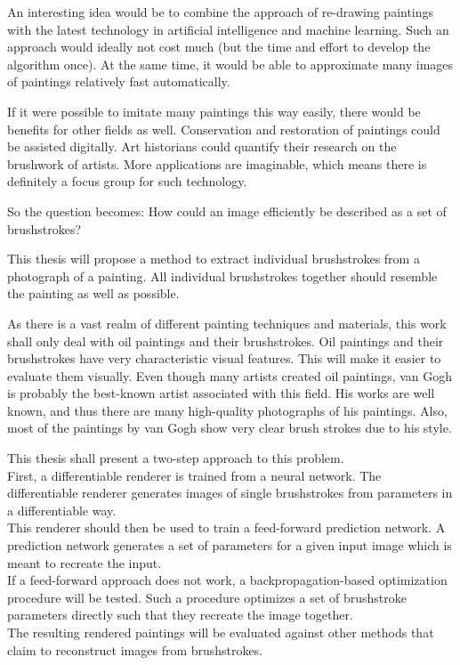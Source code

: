 An interesting idea would be to combine the approach of re-drawing paintings with the latest technology in artificial intelligence and machine learning.
Such an approach would ideally not cost much (but the time and effort to develop the algorithm once).
At the same time, it would be able to approximate many images of paintings relatively fast automatically.

If it were possible to imitate many paintings this way easily, there would be benefits for other fields as well.
Conservation and restoration of paintings could be assisted digitally.
Art historians could quantify their research on the brushwork of artists.
More applications are imaginable, which means there is definitely a focus group for such technology.

So the question becomes: How could an image efficiently be described as a set of brushstrokes?

This thesis will propose a method to extract individual brushstrokes from a photograph of a painting.
All individual brushstrokes together should resemble the painting as well as possible.

As there is a vast realm of different painting techniques and materials, this work shall only deal with oil paintings and their brushstrokes.
Oil paintings and their brushstrokes have very characteristic visual features.
This will make it easier to evaluate them visually.
Even though many artists created oil paintings, van Gogh is probably the best-known artist associated with this field.
His works are well known, and thus there are many high-quality photographs of his paintings.
Also, most of the paintings by van Gogh show very clear brush strokes due to his style.

This thesis shall present a two-step approach to this problem.\\
First, a differentiable renderer is trained from a neural network.
The differentiable renderer generates images of single brushstrokes from parameters in a differentiable way.\\
This renderer should then be used to train a feed-forward prediction network.
A prediction network generates a set of parameters for a given input image which is meant to recreate the input.\\
If a feed-forward approach does not work, a backpropagation-based optimization procedure will be tested.
Such a procedure optimizes a set of brushstroke parameters directly such that they recreate the image together.\\
The resulting rendered paintings will be evaluated against other methods that claim to reconstruct images from brushstrokes.



